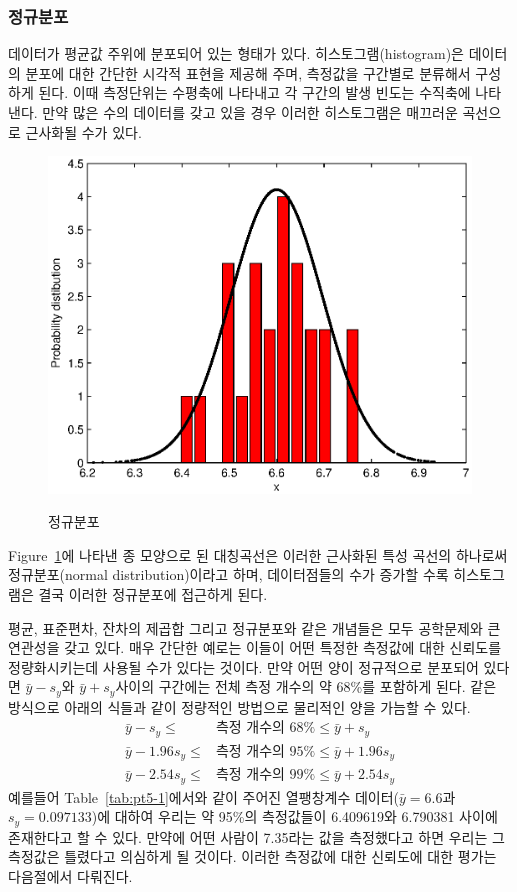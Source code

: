 \subsubsection{정규분포}
데이터가 평균값 주위에 분포되어 있는 형태가 있다. 히스토그램(histogram)은 데이터의 분포에 대한 간단한 시각적 표현을 제공해 주며, 측정값을 구간별로 분류해서 구성하게 된다. 이때 측정단위는 수평축에 나타내고 각 구간의 발생 빈도는 수직축에 나타낸다. 만약 많은 수의 데이터를 갖고 있을 경우 이러한 히스토그램은 매끄러운 곡선으로 근사화될 수가 있다.
\begin{figure}[!hbpt]
\centering
\includegraphics[keepaspectratio=true,width=0.6\linewidth]{MATLAB/chap11/dist.eps}
\label{fig:pt5-2}
\caption{정규분포}
\end{figure}
Figure~\ref{fig:pt5-2}에 나타낸 종 모양으로 된 대칭곡선은 이러한 근사화된 특성 곡선의 하나로써 정규분포(normal distribution)이라고 하며, 데이터점들의 수가 증가할 수록 히스토그램은 결국 이러한 정규분포에 접근하게 된다.

평균, 표준편차, 잔차의 제곱합 그리고 정규분포와 같은 개념들은 모두 공학문제와 큰 연관성을 갖고 있다. 매우 간단한 예로는 이들이 어떤 특정한 측정값에 대한 신뢰도를 정량화시키는데 사용될 수가 있다는 것이다. 만약 어떤 양이 정규적으로 분포되어 있다면 $\bar{y}-s_{y}$와 $\bar{y}+s_{y}$사이의 구간에는 전체 측정 개수의 약 68\%를 포함하게 된다. 같은 방식으로 아래의 식들과 같이 정량적인 방법으로 물리적인 양을 가늠할 수 있다.
\begin{align*}
\bar{y}-s_{y}\leq&\text{측정 개수의 }68\%\leq\bar{y}+s_{y}\\
\bar{y}-1.96s_{y}\leq&\text{측정 개수의 }95\%\leq\bar{y}+1.96s_{y}\\
\bar{y}-2.54s_{y}\leq&\text{측정 개수의 }99\%\leq\bar{y}+2.54s_{y}
\end{align*}
예를들어 Table~\ref{tab:pt5-1}에서와 같이 주어진 열팽창계수 데이터($\bar{y}=6.6$과 $s_{y}=0.097133$)에 대하여 우리는 약 95\%의 측정값들이 6.409619와 6.790381 사이에 존재한다고 할 수 있다. 만약에 어떤 사람이 7.35라는 값을 측정했다고 하면 우리는 그 측정값은 틀렸다고 의심하게 될 것이다. 이러한 측정값에 대한 신뢰도에 대한 평가는 다음절에서 다뤄진다.
